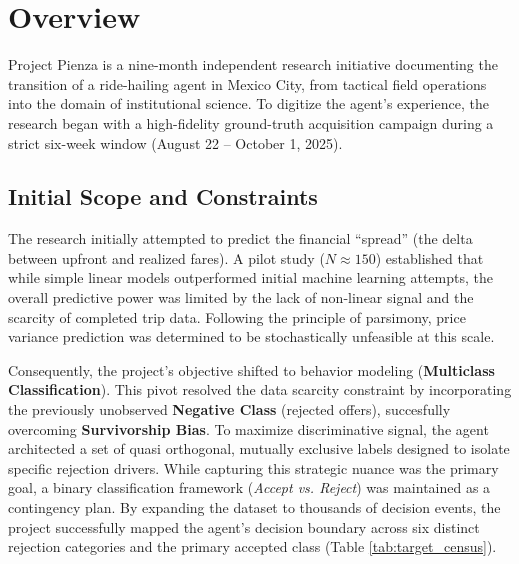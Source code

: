 \documentclass[10pt, letterpaper]{article}
\begin{document}
\newpage
\section{Overview}

Project Pienza is a nine-month independent research initiative documenting the transition of a ride-hailing agent in Mexico City, from tactical field operations into the domain of institutional science. To digitize the agent’s experience, the research began with a high-fidelity ground-truth acquisition campaign during a strict six-week window (August 22 -- October 1, 2025).

\subsection{Initial Scope and Constraints}
The research initially attempted to predict the financial ``spread'' (the delta between upfront and realized fares). A pilot study ($N \approx 150$) established that while simple linear models outperformed initial machine learning attempts, the overall predictive power was limited by the lack of non-linear signal and the scarcity of completed trip data. Following the principle of parsimony, price variance prediction was determined to be stochastically unfeasible at this scale.

Consequently, the project's objective shifted to behavior modeling (\textbf{Multiclass Classification}). This pivot resolved the data scarcity constraint by incorporating the previously unobserved \textbf{Negative Class} (rejected offers), succesfully overcoming  \textbf{Survivorship Bias}. To maximize discriminative signal, the agent architected a set of quasi orthogonal, mutually exclusive labels designed to isolate specific rejection drivers. While capturing this strategic nuance was the primary goal, a binary classification framework (\textit{Accept vs. Reject}) was maintained as a contingency plan. By expanding the dataset to thousands of decision events, the project successfully mapped the agent's decision boundary across six distinct rejection categories and the primary accepted class (Table \ref{tab:target_census}).
\end{document}
